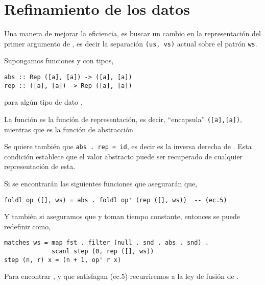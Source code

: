 \section{Refinamiento de los datos}

Una manera de mejorar la eficiencia, es buscar un cambio en la representación del primer argumento 
de , es decir la separación \texttt{(us, vs)} actual sobre el patrón \texttt{ws}.

Supongamos funciones  y  con tipos,

\begin{verbatim}
abs :: Rep ([a], [a]) -> ([a], [a])
rep :: ([a], [a]) -> Rep ([a], [a])
\end{verbatim}

para algún tipo de dato .

La función  es la función de representación, es decir, ``encapsula'' \texttt{([a],[a])},
mientras que  es la función de abstracción. %

Se quiere también que \texttt{abs . rep = id}, es decir  es la inversa derecha de
. Esta condición establece que el valor abstracto puede ser recuperado de cualquier
representación de esta.

Si se encontrarán las siguientes funciones que asegurarán que, %
\begin{verbatim}
foldl op ([], ws) = abs . foldl op' (rep ([], ws))  -- (ec.5)
\end{verbatim}

Y también si aseguramos que  y  toman tiempo constante, entonces se puede
redefinir  como,

\begin{verbatim}
matches ws = map fst . filter (null . snd . abs . snd) .
             scanl step (0, rep ([], ws))
step (n, r) x = (n + 1, op' r x)    
\end{verbatim}

Para encontrar ,  y  que satisfagan (ec.5) recurriremos a la ley de fusión de .

